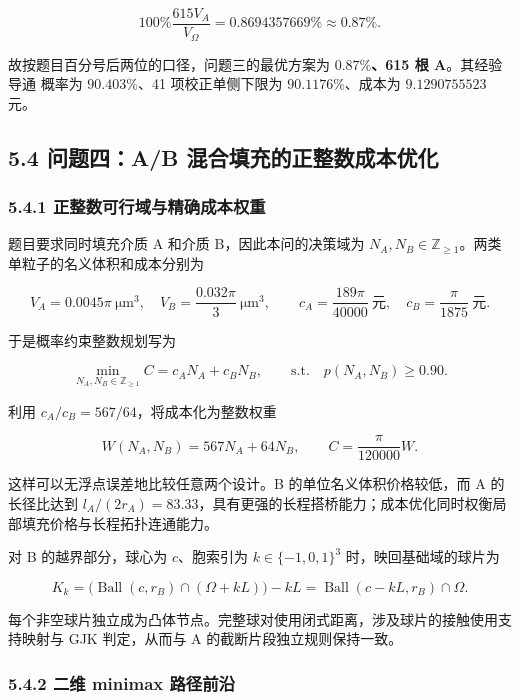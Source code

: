 \[
100\%\frac{615V_A}{V_\Omega}=0.8694357669\%\approx\mathbf{0.87\%}.
\]

故按题目百分号后两位的口径，问题三的最优方案为 \textbf{\(0.87\%\)、615 根 A}。其经验导通 概率为 \(90.403\%\)、41 项校正单侧下限为 \(90.1176\%\)、成本为 \(9.1290755523\) 元。

\subsection{5.4 问题四：A/B 混合填充的正整数成本优化}\label{ux95eeux9898ux56dbab-ux6df7ux5408ux586bux5145ux7684ux6b63ux6574ux6570ux6210ux672cux4f18ux5316}

\subsubsection{5.4.1 正整数可行域与精确成本权重}\label{ux6b63ux6574ux6570ux53efux884cux57dfux4e0eux7cbeux786eux6210ux672cux6743ux91cd}

题目要求同时填充介质 A 和介质 B，因此本问的决策域为 \(N_A,N_B\in\mathbb Z_{\ge1}\)。两类单粒子的名义体积和成本分别为

\[
V_A=0.0045\pi\ \mathrm{\mu m^3},\quad
V_B=\frac{0.032\pi}{3}\ \mathrm{\mu m^3},\qquad
c_A=\frac{189\pi}{40000}\ \text{元},\quad
c_B=\frac{\pi}{1875}\ \text{元}.
\]

于是概率约束整数规划写为

\[
\min_{N_A,N_B\in\mathbb Z_{\ge1}} C=c_AN_A+c_BN_B,
\qquad \text{s.t.}\quad p(N_A,N_B)\ge0.90.
\]

利用 \(c_A/c_B=567/64\)，将成本化为整数权重

\[
W(N_A,N_B)=567N_A+64N_B,\qquad C=\frac{\pi}{120000}W.
\]

这样可以无浮点误差地比较任意两个设计。B 的单位名义体积价格较低，而 A 的长径比达到 \(l_A/(2r_A)=83.33\)，具有更强的长程搭桥能力；成本优化同时权衡局部填充价格与长程拓扑连通能力。

对 B 的越界部分，球心为 \(c\)、胞索引为 \(k\in\{-1,0,1\}^3\) 时，映回基础域的球片为

\[
K_k=\bigl(\operatorname{Ball}(c,r_B)\cap(\Omega+kL)\bigr)-kL
=\operatorname{Ball}(c-kL,r_B)\cap\Omega.
\]

每个非空球片独立成为凸体节点。完整球对使用闭式距离，涉及球片的接触使用支持映射与 GJK 判定，从而与 A 的截断片段独立规则保持一致。

\subsubsection{5.4.2 二维 minimax 路径前沿}\label{ux4e8cux7ef4-minimax-ux8defux5f84ux524dux6cbf}

